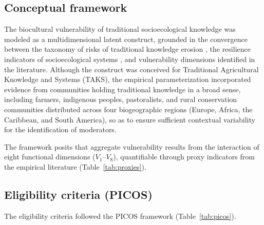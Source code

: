 \documentclass[12pt,a4paper]{article}
\begin{document}
\subsection{Conceptual framework}
\label{sec:framework}

The biocultural vulnerability of traditional socioecological knowledge was modeled as a multidimensional latent construct, grounded in the convergence between the taxonomy of risks of traditional knowledge erosion \citep{Agrawal2002}, the resilience indicators of socioecological systems \citep{Folke2016}, and vulnerability dimensions identified in the literature. Although the construct was conceived for Traditional Agricultural Knowledge and Systems (TAKS), the empirical parameterization incorporated evidence from communities holding traditional knowledge in a broad sense, including farmers, indigenous peoples, pastoralists, and rural conservation communities distributed across four biogeographic regions (Europe, Africa, the Caribbean, and South America), so as to ensure sufficient contextual variability for the identification of moderators.

The framework posits that aggregate vulnerability results from the interaction of eight functional dimensions ($V_1$--$V_8$), quantifiable through proxy indicators from the empirical literature (Table~\ref{tab:proxies}).

\subsection{Eligibility criteria (PICOS)}
\label{sec:picos}

The eligibility criteria followed the PICOS framework (Table~\ref{tab:picos}).
\end{document}
